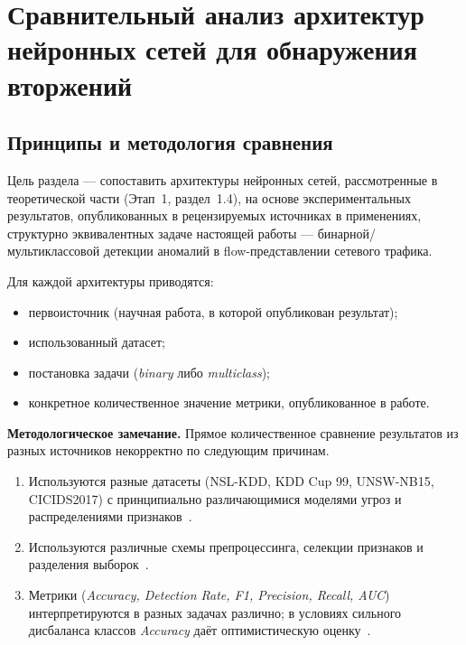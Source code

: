 
\section{Сравнительный анализ архитектур нейронных сетей для обнаружения вторжений}

\subsection{Принципы и методология сравнения}

Цель раздела --- сопоставить архитектуры нейронных сетей, рассмотренные в
теоретической части (Этап~1, раздел~1.4), на основе экспериментальных
результатов, опубликованных в рецензируемых источниках в применениях,
структурно эквивалентных задаче настоящей работы --- бинарной/мультиклассовой
детекции аномалий в flow-представлении сетевого трафика.

Для каждой архитектуры приводятся:
\begin{itemize}
    \item первоисточник (научная работа, в которой опубликован результат);
    \item использованный датасет;
    \item постановка задачи (\emph{binary} либо \emph{multiclass});
    \item конкретное количественное значение метрики, опубликованное в работе.
\end{itemize}

\textbf{Методологическое замечание.} Прямое количественное сравнение
результатов из разных источников некорректно по следующим причинам.
\begin{enumerate}
    \item Используются разные датасеты (NSL-KDD, KDD Cup 99, UNSW-NB15,
    CICIDS2017) с принципиально различающимися моделями угроз и распределениями
    признаков~\cite{moustafa2016eval, sommer2010outside, sharafaldin2018toward}.
    \item Используются различные схемы препроцессинга, селекции признаков и
    разделения выборок~\cite{khraisat2019survey, ferrag2020dlcyber}.
    \item Метрики (\emph{Accuracy, Detection Rate, F1, Precision, Recall, AUC})
    интерпретируются в разных задачах различно; в условиях сильного
    дисбаланса классов \emph{Accuracy} даёт оптимистическую
    оценку~\cite{khraisat2019survey, liu2019survey}.
\end{enumerate}

